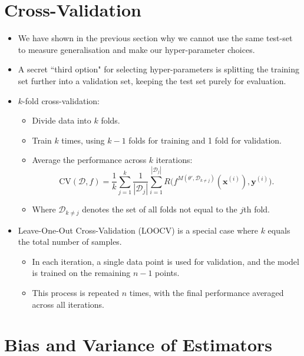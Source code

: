 \section{Cross-Validation}

\begin{itemize}
    \item We have shown in the previous section why we cannot use the same test-set to measure generalisation and make our hyper-parameter choices.
    \item A secret ``third option" for selecting hyper-parameters is splitting the training set further into a validation set, keeping the test set purely for evaluation.
    \item $k$-fold cross-validation:
          \begin{itemize}
              \item Divide data into $k$ folds.
              \item Train $k$ times, using $k-1$ folds for training and 1 fold for validation.
              \item Average the performance across $k$ iterations:
                    \[
                        \mathrm{CV}(\mathcal{D}, f) = \frac{1}{k} \sum_{j=1}^k \frac{1}{|\mathcal{D}_j|} \sum_{i=1}^{|\mathcal{D}_j|} R\Big(f^{M(\theta', \mathcal{D}_{k \neq j})}(\mathbf{x}^{(i)}), \mathbf{y}^{(i)}\Big).
                    \]
              \item  Where $\mathcal{D}_{k\neq j}$ denotes the set of all folds not equal to the $j$th fold.
          \end{itemize}
    \item Leave-One-Out Cross-Validation (LOOCV) is a special case where $k$ equals the total number of samples.
          \begin{itemize}
              \item In each iteration, a single data point is used for validation, and the model is trained on the remaining $n-1$ points.
              \item This process is repeated $n$ times, with the final performance averaged across all iterations.
          \end{itemize}
\end{itemize}

\section{Bias and Variance of Estimators}


